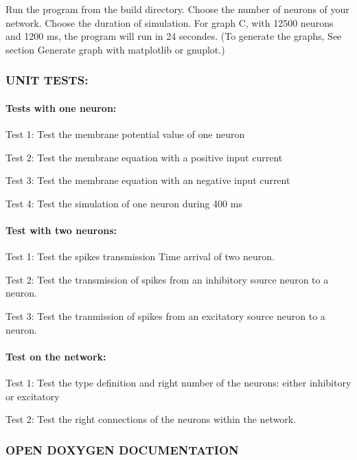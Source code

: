 Run the program from the build directory. Choose the number of neurons of your network. Choose the duration of simulation. For graph C, with 12500 neurons and 1200 ms, the program will run in 24 secondes. (To generate the graphs, See section Generate graph with matplotlib or gnuplot.)

\subsubsection*{U\-N\-I\-T T\-E\-S\-T\-S\-:}

\paragraph*{Tests with one neuron\-:}

Test 1\-: Test the membrane potential value of one neuron

Test 2\-: Test the membrane equation with a positive input current

Test 3\-: Test the membrane equation with an negative input current

Test 4\-: Test the simulation of one neuron during 400 ms

\paragraph*{Test with two neurons\-:}

Test 1\-: Test the spikes transmission Time arrival of two neuron.

Test 2\-: Test the transmission of spikes from an inhibitory source neuron to a neuron.

Test 3\-: Test the tranmission of spikes from an excitatory source neuron to a neuron.

\paragraph*{Test on the network\-:}

Test 1\-: Test the type definition and right number of the neurons\-: either inhibitory or excitatory

Test 2\-: Test the right connections of the neurons within the network.

\subsubsection*{O\-P\-E\-N D\-O\-X\-Y\-G\-E\-N D\-O\-C\-U\-M\-E\-N\-T\-A\-T\-I\-O\-N}

